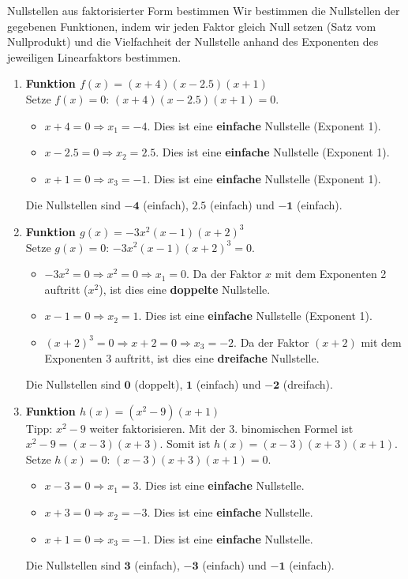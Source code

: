 \begin{loesungsumgebung}{Nullstellen aus faktorisierter Form bestimmen}
Wir bestimmen die Nullstellen der gegebenen Funktionen, indem wir jeden Faktor gleich Null setzen (Satz vom Nullprodukt) und die Vielfachheit der Nullstelle anhand des Exponenten des jeweiligen Linearfaktors bestimmen.

\begin{enumerate}[label=(\alph*)]
    \item \textbf{Funktion $f(x) = (x+4)(x-2.5)(x+1)$} \\
    Setze $f(x)=0$: $(x+4)(x-2.5)(x+1) = 0$.
    \begin{itemize}
        \item $x+4 = 0 \Rightarrow x_1 = -4$. Dies ist eine \textbf{einfache} Nullstelle (Exponent 1).
        \item $x-2.5 = 0 \Rightarrow x_2 = 2.5$. Dies ist eine \textbf{einfache} Nullstelle (Exponent 1).
        \item $x+1 = 0 \Rightarrow x_3 = -1$. Dies ist eine \textbf{einfache} Nullstelle (Exponent 1).
    \end{itemize}
    Die Nullstellen sind $\mathbf{-4}$ (einfach), $\mathbf{2.5}$ (einfach) und $\mathbf{-1}$ (einfach).

    \item \textbf{Funktion $g(x) = -3x^2(x-1)(x+2)^3$} \\
    Setze $g(x)=0$: $-3x^2(x-1)(x+2)^3 = 0$.
    \begin{itemize}
        \item $-3x^2 = 0 \Rightarrow x^2 = 0 \Rightarrow x_1 = 0$. Da der Faktor $x$ mit dem Exponenten 2 auftritt ($x^2$), ist dies eine \textbf{doppelte} Nullstelle.
        \item $x-1 = 0 \Rightarrow x_2 = 1$. Dies ist eine \textbf{einfache} Nullstelle (Exponent 1).
        \item $(x+2)^3 = 0 \Rightarrow x+2 = 0 \Rightarrow x_3 = -2$. Da der Faktor $(x+2)$ mit dem Exponenten 3 auftritt, ist dies eine \textbf{dreifache} Nullstelle.
    \end{itemize}
    Die Nullstellen sind $\mathbf{0}$ (doppelt), $\mathbf{1}$ (einfach) und $\mathbf{-2}$ (dreifach).

    \item \textbf{Funktion $h(x) = (x^2-9)(x+1)$} \\
    Tipp: $x^2-9$ weiter faktorisieren. Mit der 3. binomischen Formel ist $x^2-9 = (x-3)(x+3)$.
    Somit ist $h(x) = (x-3)(x+3)(x+1)$.
    Setze $h(x)=0$: $(x-3)(x+3)(x+1) = 0$.
    \begin{itemize}
        \item $x-3 = 0 \Rightarrow x_1 = 3$. Dies ist eine \textbf{einfache} Nullstelle.
        \item $x+3 = 0 \Rightarrow x_2 = -3$. Dies ist eine \textbf{einfache} Nullstelle.
        \item $x+1 = 0 \Rightarrow x_3 = -1$. Dies ist eine \textbf{einfache} Nullstelle.
    \end{itemize}
    Die Nullstellen sind $\mathbf{3}$ (einfach), $\mathbf{-3}$ (einfach) und $\mathbf{-1}$ (einfach).


\end{enumerate}
\end{loesungsumgebung}
